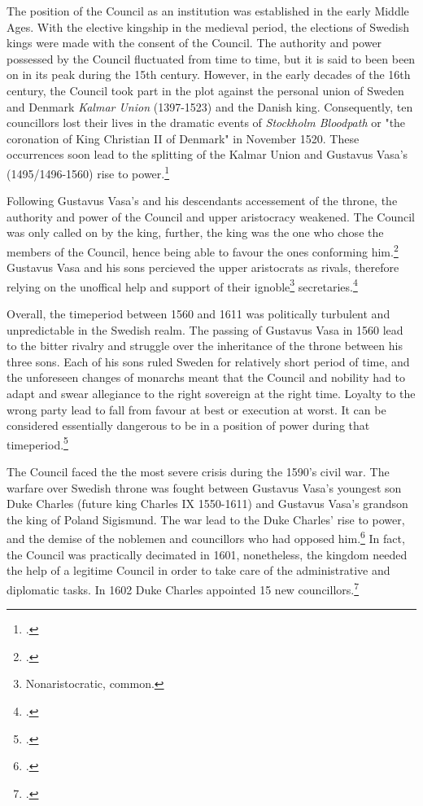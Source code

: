 The position of the Council as an institution was established in the early Middle Ages. With the elective kingship in the medieval period, the elections of Swedish kings were made with the consent of the Council. The authority and power possessed by the Council fluctuated from time to time, but it is said to been been on in its peak during the 15th century. However, in the early decades of the 16th century, the Council took part in the plot against the personal union of Sweden and Denmark \textit{Kalmar Union} (1397-1523) and the Danish king. Consequently, ten councillors lost their lives in the dramatic events of \textit{Stockholm Bloodpath} or "the coronation of King Christian II of Denmark" in November 1520. These occurrences soon lead to the splitting of the Kalmar Union and Gustavus Vasa's (1495/1496-1560) rise to power.\footcites[pp. 49-50,]{HakanenAKoskinen2017}[pp. 8-9.]{personalAgency}

Following Gustavus Vasa's and his descendants accessement of the throne, the authority and power of the Council and upper aristocracy weakened. The Council was only called on by the king, further, the king was the one who chose the members of the Council, hence being able to favour the ones conforming him.\footcite[p. 58.]{pSuurvalta} Gustavus Vasa and his sons percieved the upper aristocrats as rivals, therefore relying on the unoffical help and support of their ignoble\footnote{Nonaristocratic, common.} secretaries.\footcite[p. 53.]{HakanenAKoskinen2017}

Overall, the timeperiod between 1560 and 1611 was politically turbulent and unpredictable in the Swedish realm. The passing of Gustavus Vasa in 1560 lead to the bitter rivalry and struggle over the inheritance of the throne between his three sons. Each of his sons ruled Sweden for relatively short period of time, and the unforeseen changes of monarchs meant that the Council and nobility had to adapt and swear allegiance to the right sovereign at the right time. Loyalty to the wrong party lead to fall from favour at best or execution at worst. It can be considered essentially dangerous to be in a position of power during that timeperiod.\footcites[pp. 96-121,]{pSuurvalta}[pp. 51-52.]{HakanenAKoskinen2017}

The Council faced the the most severe crisis during the 1590's civil war. The warfare over Swedish throne was fought between Gustavus Vasa's youngest son Duke Charles (future king Charles IX 1550-1611) and Gustavus Vasa's grandson the king of Poland Sigismund. The war lead to the Duke Charles' rise to power, and the demise of the noblemen and councillors who had opposed him.\footcites[pp. 57-60,]{HakanenAKoskinen2017}[pp. 96-121.]{pSuurvalta} In fact, the Council was practically decimated in 1601, nonetheless, the kingdom needed the help of a legitime Council in order to take care of the administrative and diplomatic tasks. In 1602 Duke Charles appointed 15 new councillors.\footcite[pp. 57-59.]{HakanenAKoskinen2017}

